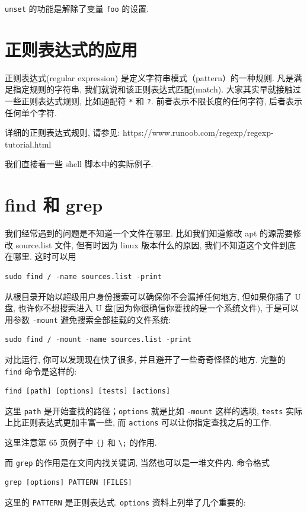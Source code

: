\documentclass[a4paper]{ctexart}
\begin{document}
\verb|unset| 的功能是解除了变量 \verb|foo| 的设置.

\section{正则表达式的应用}

正则表达式(regular expression) 是定义字符串模式（pattern）的一种规则.
凡是满足指定规则的字符串, 我们就说和该正则表达式匹配(match). 
大家其实早就接触过一些正则表达式规则, 比如通配符 \verb|*| 和 \verb|?|.
前者表示不限长度的任何字符, 后者表示任何单个字符.

详细的正则表达式规则, 请参见: \newline
https://www.runoob.com/regexp/regexp-tutorial.html

我们直接看一些 shell 脚本中的实际例子. 

\section{find 和 grep}

我们经常遇到的问题是不知道一个文件在哪里. 比如我们知道修改 apt 的源需要修改 source.list 文件,
但有时因为 linux 版本什么的原因, 我们不知道这个文件到底在哪里. 这时可以用
\begin{verbatim}
sudo find / -name sources.list -print
\end{verbatim}
从根目录开始以超级用户身份搜索可以确保你不会漏掉任何地方,
但如果你插了 U 盘, 也许你不想搜索进入 U 盘(因为你很确信你要找的是一个系统文件), 于是可以用参数
\verb|-mount| 避免搜索全部挂载的文件系统:
\begin{verbatim}
sudo find / -mount -name sources.list -print
\end{verbatim}
对比运行, 你可以发现现在快了很多, 并且避开了一些奇奇怪怪的地方.
完整的 \verb|find| 命令是这样的:
\begin{verbatim}
find [path] [options] [tests] [actions]
\end{verbatim}
这里 \verb|path| 是开始查找的路径；\verb|options| 就是比如 \verb|-mount|
这样的选项, \verb|tests| 实际上比正则表达式更加丰富一些, 而 \verb|actions|
可以让你指定查找之后的工作.

这里注意第 65 页例子中 \verb|{}| 和 \verb|\;| 的作用\cite{zhoudx2020universality}.

而 \verb|grep| 的作用是在文间内找关键词, 当然也可以是一堆文件内. 命令格式
\begin{verbatim}
grep [options] PATTERN [FILES]
\end{verbatim}
这里的 \verb|PATTERN| 是正则表达式. \verb|options| 资料上列举了几个重要的:
\end{document}
